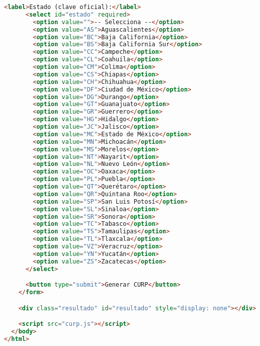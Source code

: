 \documentclass[10pt,a4paper]{article}
\begin{document}
\begin{lstlisting}[language=HTML]
      <label>Estado (clave oficial):</label>
      <select id="estado" required>
        <option value="">-- Selecciona --</option>
        <option value="AS">Aguascalientes</option>
        <option value="BC">Baja California</option>
        <option value="BS">Baja California Sur</option>
        <option value="CC">Campeche</option>
        <option value="CL">Coahuila</option>
        <option value="CM">Colima</option>
        <option value="CS">Chiapas</option>
        <option value="CH">Chihuahua</option>
        <option value="DF">Ciudad de México</option>
        <option value="DG">Durango</option>
        <option value="GT">Guanajuato</option>
        <option value="GR">Guerrero</option>
        <option value="HG">Hidalgo</option>
        <option value="JC">Jalisco</option>
        <option value="MC">Estado de México</option>
        <option value="MN">Michoacán</option>
        <option value="MS">Morelos</option>
        <option value="NT">Nayarit</option>
        <option value="NL">Nuevo León</option>
        <option value="OC">Oaxaca</option>
        <option value="PL">Puebla</option>
        <option value="QT">Querétaro</option>
        <option value="QR">Quintana Roo</option>
        <option value="SP">San Luis Potosí</option>
        <option value="SL">Sinaloa</option>
        <option value="SR">Sonora</option>
        <option value="TC">Tabasco</option>
        <option value="TS">Tamaulipas</option>
        <option value="TL">Tlaxcala</option>
        <option value="VZ">Veracruz</option>
        <option value="YN">Yucatán</option>
        <option value="ZS">Zacatecas</option>
      </select>

      <button type="submit">Generar CURP</button>
    </form>

    <div class="resultado" id="resultado" style="display: none"></div>

    <script src="curp.js"></script>
  </body>
</html>
\end{lstlisting}
\end{document}

